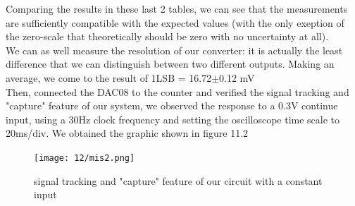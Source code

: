 Comparing the results in these last 2 tables, we can see that the measurements are sufficiently compatible with the expected values (with the only exeption of the zero-scale that theoretically should be zero with no uncertainty at all).\\
We can as well measure the resolution of our converter: it is actually the least difference that we can distinguish between two different outputs. Making an average, we come to the result of 1LSB = 16.72\(\pm\)0.12 mV \\
Then, connected the DAC08 to the counter and verified the signal tracking and "capture" feature of our system, we observed the response to a 0.3V continue input, using a 30Hz clock frequency and setting the oscilloscope time scale to 20ms/div. We obtained the graphic shown in figure 11.2\\

\begin{figure}[H]
\centering
\texttt{[image: 12/mis2.png]}
\caption{signal tracking and "capture" feature of our circuit with a constant input}
\end{figure}



